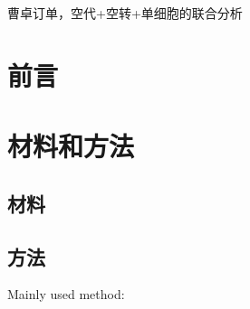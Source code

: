 \documentclass[
]{article}
\begin{document}
曹卓订单，空代+空转+单细胞的联合分析

\hypertarget{introduction}{%
\section{前言}\label{introduction}}

\hypertarget{methods}{%
\section{材料和方法}\label{methods}}

\hypertarget{ux6750ux6599}{%
\subsection{材料}\label{ux6750ux6599}}

\hypertarget{ux65b9ux6cd5}{%
\subsection{方法}\label{ux65b9ux6cd5}}

Mainly used method:
\end{document}

